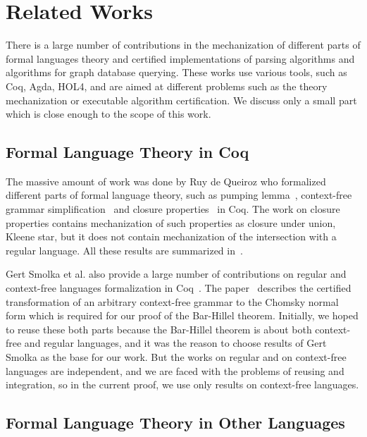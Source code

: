 \section{Related Works}
\label{sec:rel-work}

There is a large number of contributions in the mechanization of different parts of formal languages theory and certified implementations of parsing algorithms and algorithms for graph database querying.
These works use various tools, such as Coq, Agda, HOL4, and are aimed at different problems such as the theory mechanization or executable algorithm certification.
We discuss only a small part which is close enough to the scope of this work.

\subsection{Formal Language Theory in Coq}

The massive amount of work was done by Ruy de Queiroz who formalized different parts of formal language theory, such as pumping lemma~\cite{ramos2015formalizationPumping,ramos2018SomeApp}, context-free grammar simplification~\cite{ramos2015formalization} and closure properties~\cite{ramos2015formalizationClosure} in Coq.
The work on closure properties contains mechanization of such properties as closure under union, Kleene star, but it does not contain mechanization of the intersection with a regular language.
All these results are summarized in~\cite{ramos2016formalization}.

Gert Smolka et al. also provide a large number of contributions on regular and context-free languages formalization in Coq~\cite{smolka2017regular,smolka2013regular,kaiser2012constructive,smolkaHofmann2016}.
The paper~\cite{smolkaHofmann2016} describes the certified transformation of an arbitrary context-free grammar to the Chomsky normal form which is required for our proof of the Bar-Hillel theorem.
Initially, we hoped to reuse these both parts because the Bar-Hillel theorem is about both context-free and regular languages, and it was the reason to choose results of Gert Smolka as the base for our work.
But the works on regular and on context-free languages are independent, and we are faced with the problems of reusing and integration, so in the current proof, we use only results on context-free languages.

\subsection{Formal Language Theory in Other Languages}

